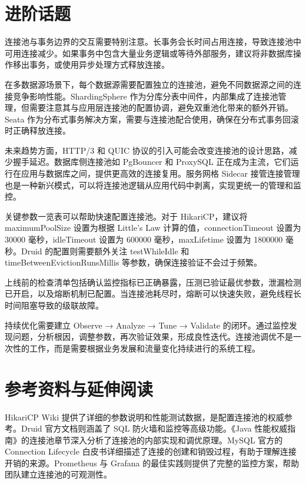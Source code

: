 \chapter{进阶话题}
连接池与事务边界的交互需要特别注意。长事务会长时间占用连接，导致连接池中可用连接减少。如果事务中包含大量业务逻辑或等待外部服务，建议将非数据库操作移出事务，或使用异步处理方式释放连接。\par
在多数据源场景下，每个数据源需要配置独立的连接池，避免不同数据源之间的连接竞争影响性能。ShardingSphere 作为分库分表中间件，内部集成了连接池管理，但需要注意其与应用层连接池的配置协调，避免双重池化带来的额外开销。Seata 作为分布式事务解决方案，需要与连接池配合使用，确保在分布式事务回滚时正确释放连接。\par
未来趋势方面，HTTP/3 和 QUIC 协议的引入可能会改变连接池的设计思路，减少握手延迟。数据库侧连接池如 PgBouncer 和 ProxySQL 正在成为主流，它们运行在应用与数据库之间，提供更高效的连接复用。服务网格 Sidecar 接管连接管理也是一种新兴模式，可以将连接池逻辑从应用代码中剥离，实现更统一的管理和监控。\par
关键参数一览表可以帮助快速配置连接池。对于 HikariCP，建议将 maximumPoolSize 设置为根据 Little’s Law 计算的值，connectionTimeout 设置为 30000 毫秒，idleTimeout 设置为 600000 毫秒，maxLifetime 设置为 1800000 毫秒。Druid 的配置则需要额外关注 testWhileIdle 和 timeBetweenEvictionRunsMillis 等参数，确保连接验证不会过于频繁。\par
上线前的检查清单包括确认监控指标已正确暴露，压测已验证最优参数，泄漏检测已开启，以及熔断机制已配置。当连接池耗尽时，熔断可以快速失败，避免线程长时间阻塞导致的级联故障。\par
持续优化需要建立 Observe → Analyze → Tune → Validate 的闭环。通过监控发现问题，分析根因，调整参数，再次验证效果，形成良性迭代。连接池调优不是一次性的工作，而是需要根据业务发展和流量变化持续进行的系统工程。\par
\chapter{参考资料与延伸阅读}
HikariCP Wiki 提供了详细的参数说明和性能测试数据，是配置连接池的权威参考。Druid 官方文档则涵盖了 SQL 防火墙和监控等高级功能。《Java 性能权威指南》的连接池章节深入分析了连接池的内部实现和调优原理。MySQL 官方的 Connection Lifecycle 白皮书详细描述了连接的创建和销毁过程，有助于理解连接开销的来源。Prometheus 与 Grafana 的最佳实践则提供了完整的监控方案，帮助团队建立连接池的可观测性。\par

